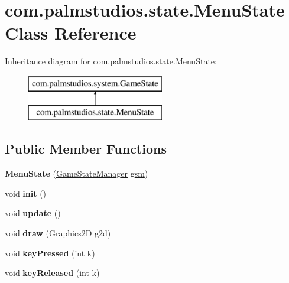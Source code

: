 \hypertarget{classcom_1_1palmstudios_1_1state_1_1_menu_state}{}\section{com.\+palmstudios.\+state.\+Menu\+State Class Reference}
\label{classcom_1_1palmstudios_1_1state_1_1_menu_state}
Inheritance diagram for com.\+palmstudios.\+state.\+Menu\+State\+:\begin{figure}[H]
\begin{center}
\leavevmode
\includegraphics[height=2.000000cm]{classcom_1_1palmstudios_1_1state_1_1_menu_state}
\end{center}
\end{figure}
\subsection*{Public Member Functions}
\begin{DoxyCompactItemize}
\item 
\mbox{\label{classcom_1_1palmstudios_1_1state_1_1_menu_state_af62c6460849b2c4a7a42864e9896abb8}} 
{\bfseries Menu\+State} (\hyperlink{classcom_1_1palmstudios_1_1state_1_1_game_state_manager}{Game\+State\+Manager} \hyperlink{classcom_1_1palmstudios_1_1system_1_1_game_state_a3a9b05fb9a962eabae260371069a79eb}{gsm})
\item 
\mbox{\label{classcom_1_1palmstudios_1_1state_1_1_menu_state_a9dca055cda98ec9e9746429128ed4a9d}} 
void {\bfseries init} ()
\item 
\mbox{\label{classcom_1_1palmstudios_1_1state_1_1_menu_state_aeaaf933ee1036d8a82a7774cedfafa16}} 
void {\bfseries update} ()
\item 
\mbox{\label{classcom_1_1palmstudios_1_1state_1_1_menu_state_a64133bef25dc148c55f0d33077c2c1c7}} 
void {\bfseries draw} (Graphics2D g2d)
\item 
\mbox{\label{classcom_1_1palmstudios_1_1state_1_1_menu_state_a77bce5b5402a44895f2d9262ddb96b73}} 
void {\bfseries key\+Pressed} (int k)
\item 
\mbox{\label{classcom_1_1palmstudios_1_1state_1_1_menu_state_ad196ccfa9dcae46f1d5d29d339299ca3}} 
void {\bfseries key\+Released} (int k)
\end{DoxyCompactItemize}
